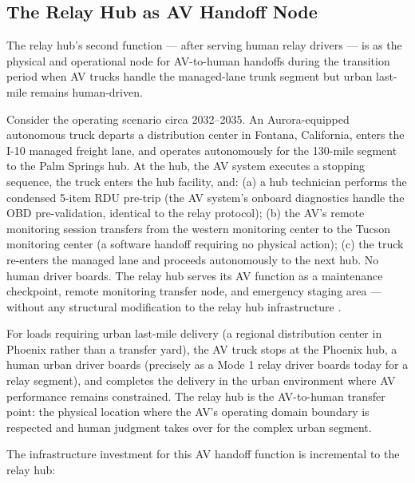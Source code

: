 \subsection{The Relay Hub as AV Handoff Node}

The relay hub's second function --- after serving human relay drivers --- is as the physical
and operational node for AV-to-human handoffs during the transition period when AV trucks
handle the managed-lane trunk segment but urban last-mile remains human-driven.

Consider the operating scenario circa 2032--2035. An Aurora-equipped autonomous truck departs
a distribution center in Fontana, California, enters the I-10 managed freight lane, and
operates autonomously for the 130-mile segment to the Palm Springs hub. At the hub, the AV
system executes a stopping sequence, the truck enters the hub facility, and: (a) a hub
technician performs the condensed 5-item RDU pre-trip (the AV system's onboard diagnostics
handle the OBD pre-validation, identical to the relay protocol); (b) the AV's remote monitoring
session transfers from the western monitoring center to the Tucson monitoring center (a
software handoff requiring no physical action); (c) the truck re-enters the managed lane and
proceeds autonomously to the next hub. No human driver boards. The relay hub serves its AV
function as a maintenance checkpoint, remote monitoring transfer node, and emergency staging
area --- without any structural modification to the relay hub infrastructure \citep{ROUTE_E2}.

For loads requiring urban last-mile delivery (a regional distribution center in Phoenix rather
than a transfer yard), the AV truck stops at the Phoenix hub, a human urban driver boards
(precisely as a Mode 1 relay driver boards today for a relay segment), and completes the
delivery in the urban environment where AV performance remains constrained. The relay hub is
the AV-to-human transfer point: the physical location where the AV's operating domain boundary
is respected and human judgment takes over for the complex urban segment.

The infrastructure investment for this AV handoff function is incremental to the relay hub:

